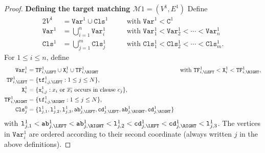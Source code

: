 \begin{proof}
  \medskip
  \textbf{Defining the target matching $\mathcal{M}{1} = (V^{1}, E^{1})$}
  \medskip
    Define
    \begin{alignat*} {2}
      V^{1} &= \texttt{Var}^{1} \cup \texttt{Cls}^{1}
      &\quad&\text{with $\texttt{Var}^{1} < \texttt{C}^{1}$}
      \\
      \texttt{Var}^{1} &= \bigcup_{i=1}^{n} \texttt{Var}^{1}_{i}
      &&\text{with $\texttt{Var}^{1}_1 < \texttt{Var}^{1}_2 < \cdots < \texttt{Var}^{1}_n$}
      \\
      \texttt{Cls}^{1} &= \bigcup_{j=1}^{m} \texttt{Cls}^{1}_{j}
      &&\text{with $\texttt{Cls}^{1}_1 < \texttt{Cls}^{1}_2 < \cdots < \texttt{Cls}^{1}_m$.}
    \end{alignat*}
    For $1 \leq i \leq n$, define
    \begin{alignat*}{2}
      \texttt{Var}^{1}_{i} &=
      \texttt{TF}^{1}_{i,\LEFT} \cup \texttt{X}^{1}_{i} \cup \texttt{TF}^{1}_{i,\RIGHT}
      &&\text{with $\texttt{TF}^{1}_{i,\LEFT} < \texttt{X}^{1}_{i} < \texttt{TF}^{1}_{i,\RIGHT}$},
      \\
      \texttt{TF}^{1}_{i,\LEFT}
      &=
      \{\texttt{tf}^{1}_{i,j,\LEFT} : 1 \leq j \leq N\},
      &&
      \\
      \texttt{X}^{1}_{i}
      &=
      \{\texttt{x}^{1}_{i,j} : \text{$x_{i}$ or $\overline{x_{i}}$ occurs in clause $c_{j}$}\},
      &&
      \\
      \texttt{TF}^{1}_{i,\RIGHT}
      &=
      \{\texttt{tf}^{1}_{i,j,\RIGHT} : 1 \leq j \leq N\},
      &&
      \\
      \texttt{Cls}^{0}_{j}
      &=
      \{
      \texttt{l}^{1}_{j,1},
      \texttt{l}^{1}_{j,2},
      \texttt{l}^{1}_{j,3},
      \texttt{ab}^{1}_{j,\LEFT},
      \texttt{cd}^{1}_{j,\LEFT},
      \texttt{ab}^{1}_{j,\RIGHT},
      \texttt{cd}^{1}_{j,\RIGHT}
      \}
      &&
    \end{alignat*}
    with
    $
    \texttt{l}^{1}_{j,1} <
    \texttt{ab}^{1}_{j,\LEFT} <
    \texttt{ab}^{1}_{j,\RIGHT} <
    \texttt{l}^{1}_{j,2} <
    \texttt{cd}^{1}_{j,\LEFT} <
    \texttt{cd}^{1}_{j,\RIGHT} <
    \texttt{l}^{1}_{j,3}
    $.
    The vertices in $\texttt{Var}^{1}_{i}$ are ordered according to their second coordinate
    (always written $j$ in the above definitions).


\end{proof}
